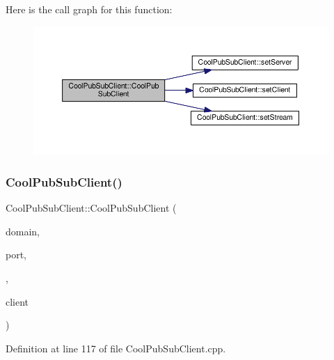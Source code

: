 Here is the call graph for this function\+:
\nopagebreak
\begin{figure}[H]
\begin{center}
\leavevmode
\includegraphics[width=350pt]{class_cool_pub_sub_client_a103e7286407babde84d63bb735c4e4b6_cgraph}
\end{center}
\end{figure}
\mbox{\label{class_cool_pub_sub_client_a2aea0a9487dc15b9db1caf0f069eb877}} 
\subsubsection{\texorpdfstring{Cool\+Pub\+Sub\+Client()}{CoolPubSubClient()}\hspace{0.1cm}{\footnotesize\ttfamily [13/14]}}
{\footnotesize\ttfamily Cool\+Pub\+Sub\+Client\+::\+Cool\+Pub\+Sub\+Client (\begin{DoxyParamCaption}\item[{const char $\ast$}]{domain,  }\item[{uint16\+\_\+t}]{port,  }\item[{\hyperlink{class_cool_pub_sub_client_a021ec75e9fbaf658370b8005ccfddc14}{M\+Q\+T\+T\+\_\+\+C\+A\+L\+L\+B\+A\+C\+K\+\_\+\+S\+I\+G\+N\+A\+T\+U\+RE}}]{,  }\item[{Client \&}]{client }\end{DoxyParamCaption})}



Definition at line 117 of file Cool\+Pub\+Sub\+Client.\+cpp.

